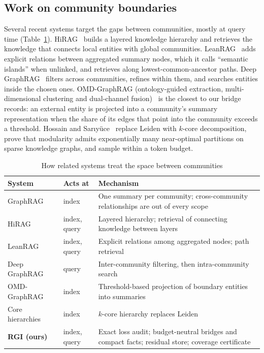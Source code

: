 \documentclass{ieeeaccess}
\theoremstyle{remark}
\begin{document}
\subsection{Work on community boundaries}
Several recent systems target the gaps between communities, mostly at query time (Table~\ref{tab:related}). HiRAG~\cite{huang2025hirag} builds a layered knowledge hierarchy and retrieves the knowledge that connects local entities with global communities. LeanRAG~\cite{zhang2026leanrag} adds explicit relations between aggregated summary nodes, which it calls ``semantic islands'' when unlinked, and retrieves along lowest-common-ancestor paths. Deep GraphRAG~\cite{li2026deepgraphrag} filters across communities, refines within them, and searches entities inside the chosen ones. OMD-GraphRAG (ontology-guided extraction, multi-dimensional clustering and dual-channel fusion)~\cite{wang2026omd} is the closest to our bridge records: an external entity is projected into a community's summary representation when the share of its edges that point into the community exceeds a threshold. Hossain and Sar{\i}y{\"u}ce~\cite{hossain2026core} replace Leiden with $k$-core decomposition, prove that modularity admits exponentially many near-optimal partitions on sparse knowledge graphs, and sample within a token budget.

\begin{table}[!htbp]
\caption{How related systems treat the space between communities}\label{tab:related}
\centering\footnotesize
\begin{tabular}{@{}p{2.05cm}p{0.95cm}p{4.55cm}@{}}
\toprule
System & Acts at & Mechanism \\
\midrule
GraphRAG~\cite{edge2024graphrag} & index & One summary per community; cross-community relationships are out of every scope \\
HiRAG~\cite{huang2025hirag} & index, query & Layered hierarchy; retrieval of connecting knowledge between layers \\
LeanRAG~\cite{zhang2026leanrag} & index, query & Explicit relations among aggregated nodes; path retrieval \\
Deep GraphRAG~\cite{li2026deepgraphrag} & query & Inter-community filtering, then intra-community search \\
OMD-GraphRAG~\cite{wang2026omd} & index & Threshold-based projection of boundary entities into summaries \\
Core hierarchies~\cite{hossain2026core} & index & $k$-core hierarchy replaces Leiden \\
\textbf{RGI (ours)} & index, query & Exact loss audit; budget-neutral bridges and compact facts; residual store; coverage certificate \\
\bottomrule
\end{tabular}
\end{table}
\end{document}
